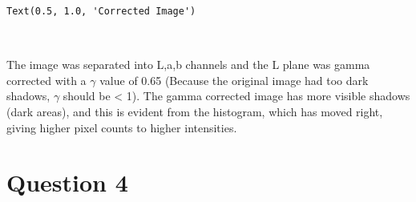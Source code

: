\documentclass[11pt]{article}
\makeatletter
\newcommand{\boxspacing}{\kern\kvtcb@left@rule\kern\kvtcb@boxsep}
\newcommand{\prompt}[4]{
        {\ttfamily\llap{{\color{#2}[#3]:\hspace{3pt}#4}}\vspace{-\baselineskip}}
    }
\makeatother
\begin{document}
            \begin{tcolorbox}[breakable, size=fbox, boxrule=.5pt, pad at break*=1mm, opacityfill=0]
\prompt{Out}{outcolor}{57}{\boxspacing}
\begin{Verbatim}[commandchars=\\\{\}]
Text(0.5, 1.0, 'Corrected Image')
\end{Verbatim}
\end{tcolorbox}
        
    \begin{center}
    \end{center}
    { \hspace*{\fill} \\}
    
    The image was separated into L,a,b channels and the L plane was gamma
corrected with a \(\gamma\) value of 0.65 (Because the original image
had too dark shadows, \(\gamma\) should be \textless{} 1). The gamma
corrected image has more visible shadows (dark areas), and this is
evident from the histogram, which has moved right, giving higher pixel
counts to higher intensities.

    \section{Question 4}\label{question-4}
\end{document}
